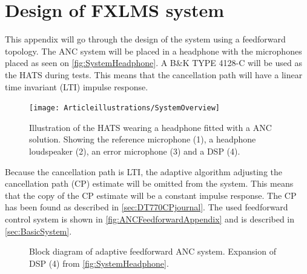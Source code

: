 \section{Design of FXLMS system} \label{sec:systemDesign}
This appendix will go through the design of the system using a feedforward topology. The ANC system will be placed in a headphone with the microphones placed as seen on \autoref{fig:SystemHeadphone}. A B\&K TYPE 4128-C will be used as the HATS during tests. This means that the cancellation path will have a linear time invariant (LTI) impulse response. 



\begin{figure}[H]
	\centering
	\texttt{[image: Articleillustrations/SystemOverview]}
	\caption{Illustration of the HATS wearing a headphone fitted with a ANC solution. Showing the reference microphone (1), a headphone loudspeaker (2), an error microphone (3) and a DSP (4).}
	\label{fig:SystemHeadphone}
\end{figure}  

Because the cancellation path is LTI, the adaptive algorithm adjusting the cancellation path (CP) estimate will be omitted from the system. This means that the copy of the CP estimate will be a constant impulse response. The CP has been found as described in \autoref{sec:DT770CPjournal}. The used feedforward control system is shown in \autoref{fig:ANCFeedforwardAppendix} and is described in \autoref{sec:BasicSystem}.


\begin{figure}[H]
	\centering
	
	\caption{Block diagram of adaptive feedforward ANC system. Expansion of DSP (4) from \autoref{fig:SystemHeadphone}.}
	\label{fig:ANCFeedforwardAppendix}
\end{figure}



